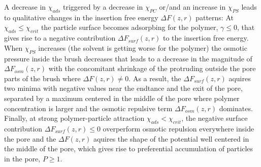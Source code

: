 \documentclass[12pt, a4paper]{article}
\newcommand\todo[1]{\textcolor{red}{#1}}
\begin{document}
A decrease in $\chi_{ads}$ triggered by a decrease in  $\chi_{PC}$ or/and an increase in $\chi_{PS}$ leads to qualitative changes in the insertion free energy 
$\Delta F(z,r)$ patterns: At $\chi_{ads}\leq \chi_{crit}$ the particle surface becomes
adsorpbing for the polymer, $\gamma \leq 0$, that gives rise to a negative contribution $\Delta F_{surf}(z,r)$ to the insertion free energy. 
When $\chi_{PS}$ increases (the solvent is getting worse for the polymer)
the osmotic pressure inside the brush decreases that leads to a decrease in the 
magnitude of $\Delta F_{osm}(z,r)$ with the concomitant shrinkage of the  protruding outside the pore parts of the brush where  $\Delta F(z,r)\neq 0$.
As a result, the $\Delta F_{surf}(z,r)$ aquires two minima with negative values near the endtance and the exit of the pore, separated by a maximum centered in the middle of the pore
where polymer concentration is larger and the osmotic repulsive term  $\Delta F_{osm}(z,r)$ dominates.
Finally, at strong polymer-particle attraction $\chi_{ads} < \chi_{crit}$, the negative surface contribution $\Delta F_{surf}(z,r)\leq 0$ overperform osmotic repulsion everywhere inside the pore
and the $\Delta F(z,r)$ aquires the shape of the potential well centered in the middle of the pore, which gives rise to preferential accumulation of particles in the pore, $P\geq 1$.












\end{document}
